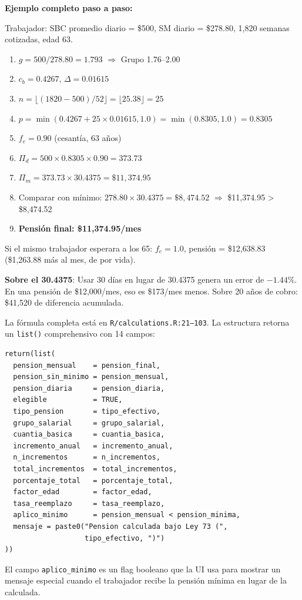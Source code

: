 \documentclass[11pt,a4paper]{report}
\begin{document}
\begin{tcolorbox}[colback=green!5!white, colframe=green!50!black, title=\textbf{Intuici\'on}]
\textbf{Ejemplo completo paso a paso:}

Trabajador: SBC promedio diario = \$500, SM diario = \$278.80, 1,820 semanas cotizadas, edad 63.

\begin{enumerate}[nosep]
\item $g = 500 / 278.80 = 1.793$ $\Rightarrow$ Grupo 1.76--2.00
\item $c_b = 0.4267$, $\Delta = 0.01615$
\item $n = \lfloor(1820 - 500) / 52\rfloor = \lfloor 25.38\rfloor = 25$
\item $p = \min(0.4267 + 25 \times 0.01615, 1.0) = \min(0.8305, 1.0) = 0.8305$
\item $f_e = 0.90$ (cesant\'ia, 63 a\~nos)
\item $\Pi_d = 500 \times 0.8305 \times 0.90 = 373.73$
\item $\Pi_m = 373.73 \times 30.4375 = \$11,374.95$
\item Comparar con m\'inimo: $278.80 \times 30.4375 = \$8,474.52$ $\Rightarrow$ \$11,374.95 > \$8,474.52
\item \textbf{Pensi\'on final: \$11,374.95/mes}
\end{enumerate}

Si el mismo trabajador esperara a los 65: $f_e = 1.0$, pensi\'on = \$12,638.83 (\$1,263.88 m\'as al mes, de por vida).

\textbf{Sobre el 30.4375}: Usar 30 d\'ias en lugar de 30.4375 genera un error de $-1.44\%$. En una pensi\'on de \$12,000/mes, eso es \$173/mes menos. Sobre 20 a\~nos de cobro: \$41,520 de diferencia acumulada.
\end{tcolorbox}

\begin{tcolorbox}[colback=orange!5!white, colframe=orange!75!black, title=\textbf{Aplicaci\'on en C\'odigo}]
La f\'ormula completa est\'a en \texttt{R/calculations.R:21--103}. La estructura retorna un \texttt{list()} comprehensivo con 14 campos:

\begin{lstlisting}
return(list(
  pension_mensual    = pension_final,
  pension_sin_minimo = pension_mensual,
  pension_diaria     = pension_diaria,
  elegible           = TRUE,
  tipo_pension       = tipo_efectivo,
  grupo_salarial     = grupo_salarial,
  cuantia_basica     = cuantia_basica,
  incremento_anual   = incremento_anual,
  n_incrementos      = n_incrementos,
  total_incrementos  = total_incrementos,
  porcentaje_total   = porcentaje_total,
  factor_edad        = factor_edad,
  tasa_reemplazo     = tasa_reemplazo,
  aplico_minimo      = pension_mensual < pension_minima,
  mensaje = paste0("Pension calculada bajo Ley 73 (",
                   tipo_efectivo, ")")
))
\end{lstlisting}

El campo \texttt{aplico\_minimo} es un flag booleano que la UI usa para mostrar un mensaje especial cuando el trabajador recibe la pensi\'on m\'inima en lugar de la calculada.
\end{tcolorbox}
\end{document}
